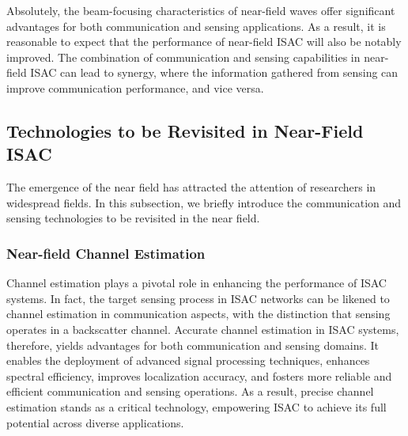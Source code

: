 \documentclass[10pt,journal,twocolumn,twoside]{IEEEtran} %
\begin{document}
Absolutely, the beam-focusing characteristics of near-field waves offer significant advantages for both communication and sensing applications. As a result, it is reasonable to expect that the performance of near-field ISAC will also be notably improved. The combination of communication and sensing capabilities in near-field ISAC can lead to synergy, where the information gathered from sensing can improve communication performance, and vice versa. 
\subsection{Technologies to be Revisited in Near-Field ISAC}
The emergence of the near field has attracted the attention of researchers in widespread fields. In this subsection, we briefly introduce the communication and sensing technologies to be revisited in the near field.

\subsubsection{\textbf{Near-field Channel Estimation}}
 Channel estimation plays a pivotal role in enhancing the performance of ISAC systems. In fact, the target sensing process in ISAC networks can be likened to channel estimation in communication aspects, with the distinction that sensing operates in a backscatter channel. Accurate channel estimation in ISAC systems, therefore, yields advantages for both communication and sensing domains. It enables the deployment of advanced signal processing techniques, enhances spectral efficiency, improves localization accuracy, and fosters more reliable and efficient communication and sensing operations. As a result, precise channel estimation stands as a critical technology, empowering ISAC to achieve its full potential across diverse applications.
\end{document}
